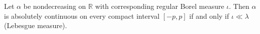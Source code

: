 Let $\alpha$ be nondecreasing on $\mathbb{R}$ with corresponding regular Borel measure $\iota$. Then $\alpha$ is absolutely continuous on every compact interval $[-p,p]$ if and only if $\iota \ll \lambda$ (Lebesgue measure).
